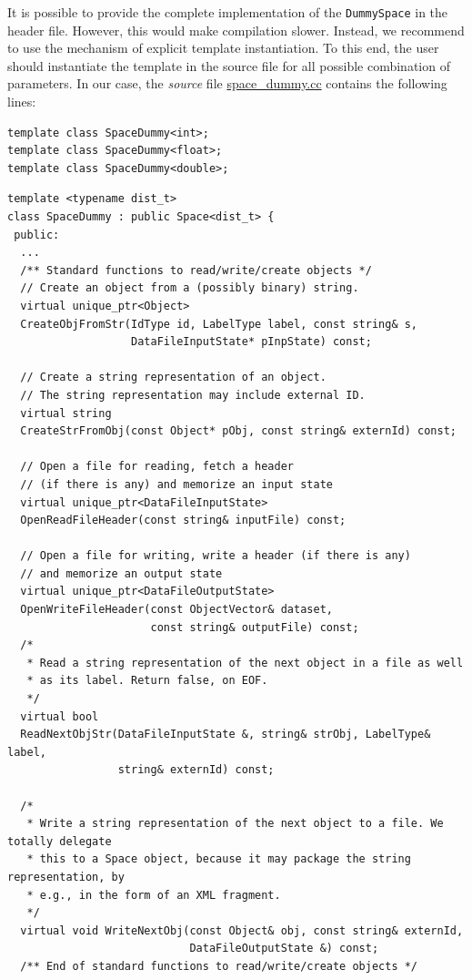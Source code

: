 \documentclass[runningheads,a4paper]{llncs}
\newcommand{\replocfile}{https://github.com/searchivarius/nmslib/blob/v1.5/}
\newcommand{\ttt}[1]{\texttt{#1}}
\begin{document}
It is possible to provide the complete implementation of the \ttt{DummySpace}
in the header file. However, this would make compilation slower.
Instead, we recommend to use the mechanism of explicit template instantiation.
To this end, the user should instantiate the template in the source file
for all possible combination of parameters.
In our case, the \emph{source} file 
\href{\replocfile similarity_search/src/space/space_dummy.cc}{space\_dummy.cc}
contains the following lines:
\begin{verbatim}
template class SpaceDummy<int>;
template class SpaceDummy<float>;
template class SpaceDummy<double>;
\end{verbatim}

\begin{table}[[!htbp]
\caption{\label{FigDummySpace}A sample space class}
\begin{verbatim}
template <typename dist_t>
class SpaceDummy : public Space<dist_t> {
 public:
  ...
  /** Standard functions to read/write/create objects */ 
  // Create an object from a (possibly binary) string.
  virtual unique_ptr<Object> 
  CreateObjFromStr(IdType id, LabelType label, const string& s,
                   DataFileInputState* pInpState) const;

  // Create a string representation of an object.
  // The string representation may include external ID.
  virtual string 
  CreateStrFromObj(const Object* pObj, const string& externId) const;

  // Open a file for reading, fetch a header 
  // (if there is any) and memorize an input state
  virtual unique_ptr<DataFileInputState> 
  OpenReadFileHeader(const string& inputFile) const;

  // Open a file for writing, write a header (if there is any) 
  // and memorize an output state
  virtual unique_ptr<DataFileOutputState> 
  OpenWriteFileHeader(const ObjectVector& dataset,
                      const string& outputFile) const;
  /*
   * Read a string representation of the next object in a file as well
   * as its label. Return false, on EOF.
   */
  virtual bool 
  ReadNextObjStr(DataFileInputState &, string& strObj, LabelType& label, 
                 string& externId) const;

  /* 
   * Write a string representation of the next object to a file. We totally delegate
   * this to a Space object, because it may package the string representation, by
   * e.g., in the form of an XML fragment.
   */
  virtual void WriteNextObj(const Object& obj, const string& externId, 
                            DataFileOutputState &) const;
  /** End of standard functions to read/write/create objects */ 


\end{verbatim}
\end{table}
\end{document}

